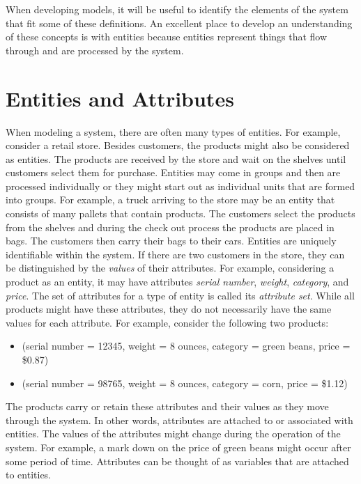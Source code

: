 \documentclass[
]{book}
\theoremstyle{definition}
\theoremstyle{definition}
\theoremstyle{definition}
\theoremstyle{definition}
\theoremstyle{remark}
\begin{document}
When developing models, it will be useful to identify the elements of
the system that fit some of these definitions. An excellent place to
develop an understanding of these concepts is with entities because
entities represent things that flow through and are processed by the
system.

\hypertarget{dem:entities}{%
\section{Entities and Attributes}\label{dem:entities}}

When modeling a system, there are often many types of entities. For
example, consider a retail store. Besides customers, the products might
also be considered as entities. The products are received by the store
and wait on the shelves until customers select them for purchase.
Entities may come in groups and then are processed individually or they
might start out as individual units that are formed into groups. For
example, a truck arriving to the store may be an entity that consists of
many pallets that contain products. The customers select the products
from the shelves and during the check out process the products are
placed in bags. The customers then carry their bags to their cars.
Entities are uniquely identifiable within the system. If there are two
customers in the store, they can be distinguished by the \emph{values} of
their attributes. For example, considering a product as an entity, it
may have attributes \emph{serial number}, \emph{weight}, \emph{category}, and \emph{price}.
The set of attributes for a type of entity is called its \emph{attribute
set}. While all products might have these attributes, they do not
necessarily have the same values for each attribute. For example,
consider the following two products:

\begin{itemize}
\item
  (serial number = 12345, weight = 8 ounces, category = green beans,
  price = \$0.87)
\item
  (serial number = 98765, weight = 8 ounces, category = corn, price =
  \$1.12)
\end{itemize}

The products carry or retain these attributes and their values as they
move through the system. In other words, attributes are attached to or
associated with entities. The values of the attributes might change
during the operation of the system. For example, a mark down on the
price of green beans might occur after some period of time. Attributes
can be thought of as variables that are attached to entities.
\end{document}
